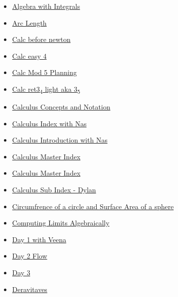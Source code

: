 \documentclass[11pt]{article}
\begin{document}
\begin{itemize}
\begin{itemize}
\begin{itemize}
\item \href{mathematics/single\_variable\_calculus/KBrefIntegralAlgebra.org}{Algebra with Integrals}
\item \href{mathematics/single\_variable\_calculus/KBrefArcLength.org}{Arc Length}
\item \href{mathematics/single\_variable\_calculus/KBe2020math401floCalcBeforeNewtonLeibniz.org}{Calc before newton}
\item \href{mathematics/single\_variable\_calculus/KBe20math401retEasy4.org}{Calc easy 4}
\item \href{mathematics/single\_variable\_calculus/KBxCalcMod5.org}{Calc Mod 5 Planning}
\item \href{mathematics/single\_variable\_calculus/KBe20math401ret3\_5.org}{Calc ret3\textsubscript{4} light aka 3\textsubscript{5}}
\item \href{mathematics/single\_variable\_calculus/KBe2020math401refCalcConceptsNotation.org}{Calculus Concepts and Notation}
\item \href{mathematics/single\_variable\_calculus/00-Topic-KB202008250914.org}{Calculus Index with Nas}
\item \href{mathematics/single\_variable\_calculus/KBe2020math401flo1.org}{Calculus Introduction with Nas}
\item \href{mathematics/single\_variable\_calculus/KBCalculusMasterIndex.org}{Calculus Master Index}
\item \href{mathematics/single\_variable\_calculus/index.org}{Calculus Master Index}
\item \href{mathematics/single\_variable\_calculus/KBd2020math401SubIndex.org}{Calculus Sub Index - Dylan}
\item \href{mathematics/single\_variable\_calculus/KBe21math401retSurfaceAreaOfSphere.org}{Circumfrence of a circle and Surface Area of a sphere}
\item \href{mathematics/single\_variable\_calculus/KBMATH401ComputingLimits.org}{Computing Limits Algebraically}
\item \href{mathematics/single\_variable\_calculus/KBhMATH401Day1.org}{Day 1 with Veena}
\item \href{mathematics/single\_variable\_calculus/KBe2020math401flo2.org}{Day 2 Flow}
\item \href{mathematics/single\_variable\_calculus/eFloCalcD3.org}{Day 3}
\item \href{mathematics/single\_variable\_calculus/KBhMATH401Derivatives.org}{Deravitaves}

\end{itemize}
\end{itemize}
\end{itemize}
\end{document}
